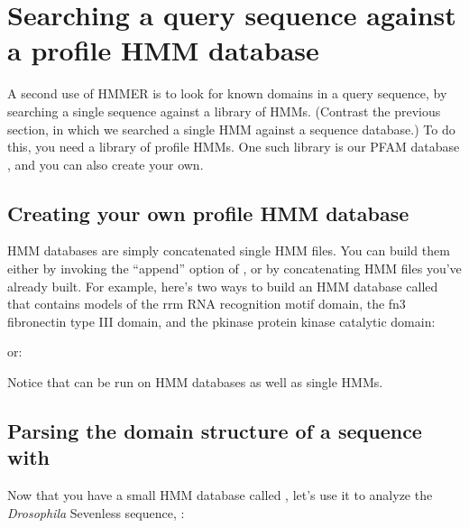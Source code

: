 \section{Searching a query sequence against a profile HMM database}

A second use of HMMER is to look for known domains in a query
sequence, by searching a single sequence against a library of
HMMs. (Contrast the previous section, in which we searched a single
HMM against a sequence database.) To do this, you need a library of
profile HMMs. One such library is our PFAM database
\cite{Sonnhammer97,Sonnhammer98}, and you can also create your own.

\subsection{Creating your own profile HMM database} 

HMM databases are simply concatenated single HMM files. You can build
them either by invoking the  ``append'' option of , or by concatenating HMM files you've already built.  For
example, here's two ways to build an HMM database called 
that contains models of the rrm RNA recognition motif domain, the fn3
fibronectin type III domain, and the pkinase protein kinase catalytic
domain:

\vspace{1.5em}

or:

\vspace{1.5em}

Notice that  can be run on HMM databases as well as
single HMMs.

\subsection{Parsing the domain structure of a sequence with }

Now that you have a small HMM database called , let's use
it to analyze the {\em Drosophila} Sevenless sequence, :

\vspace{1.5em}

